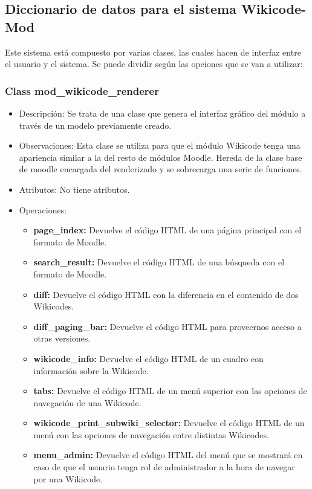 \subsection{Diccionario de datos para el sistema Wikicode-Mod}

Este sistema está compuesto por varias clases, las cuales hacen de interfaz entre el usuario y el sistema. Se puede dividir según las opciones que se van a utilizar:

\subsubsection{Class mod\_wikicode\_renderer}

\begin{itemize}
	\item Descripción: Se trata de una clase que genera el interfaz gráfico del módulo a través de un modelo previamente creado.
	\item Observaciones: Esta clase se utiliza para que el módulo Wikicode tenga una apariencia similar a la del resto de módulos Moodle. Hereda de la clase base de moodle encargada del renderizado y se sobrecarga una serie de funciones.
	\item Atributos: No tiene atributos.
	\item Operaciones:
		\begin{itemize}
			\item \textbf{page\_index: }Devuelve el código HTML de una página principal con el formato de Moodle.
			\item \textbf{search\_result: } Devuelve el código HTML de una búsqueda con el formato de Moodle.
			\item \textbf{diff: }Devuelve el código HTML con la diferencia en el contenido de dos Wikicodes.
			\item \textbf{diff\_paging\_bar: } Devuelve el código HTML para proveernos acceso a otras versiones.
			\item \textbf{wikicode\_info: }Devuelve el código HTML de un cuadro con información sobre la Wikicode.
			\item \textbf{tabs: }Devuelve el código HTML de un menú superior con las opciones de navegación de una Wikicode.
			\item \textbf{wikicode\_print\_subwiki\_selector: }Devuelve el código HTML de un menú con las opciones de navegación entre distintas Wikicodes.
			\item \textbf{menu\_admin: }Devuelve el código HTML del menú que se mostrará en caso de que el usuario tenga rol de administrador a la hora de navegar por una Wikicode.

\end{itemize}
\end{itemize}
